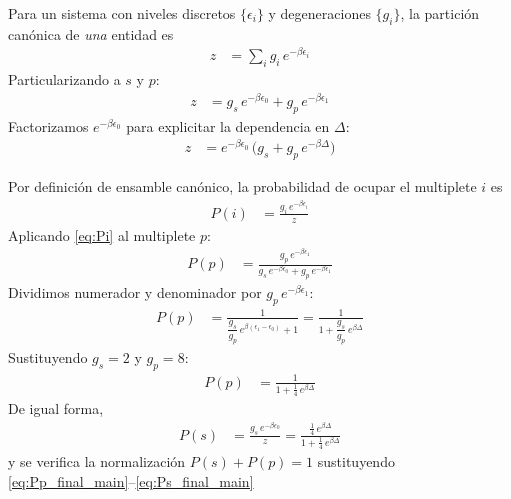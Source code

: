 \documentclass{article}
\begin{document}
Para un sistema con niveles discretos $\{\epsilon_i\}$ y degeneraciones $\{g_i\}$, la partición canónica de \textit{una} entidad es
\begin{equation}
\begin{split}
z &= \sum_i g_i\,e^{-\beta \epsilon_i}
\end{split}\label{eq:z_general}
\end{equation}
Particularizando a $s$ y $p$:
\begin{equation}
\begin{split}
z &= g_s\,e^{-\beta \epsilon_0}+g_p\,e^{-\beta \epsilon_1}
\end{split}\label{eq:z_sp}
\end{equation}
Factorizamos $e^{-\beta\epsilon_0}$ para explicitar la dependencia en $\Delta$:
\begin{equation}
\begin{split}
z &= e^{-\beta\epsilon_0}\,\Big(g_s+g_p\,e^{-\beta\Delta}\Big)
\end{split}\label{eq:z_sp_factor}
\end{equation}



Por definición de ensamble canónico, la probabilidad de ocupar el multiplete $i$ es
\begin{equation}
\begin{split}
P(i) &= \frac{g_i\,e^{-\beta \epsilon_i}}{z}
\end{split}\label{eq:Pi}
\end{equation}
Aplicando \eqref{eq:Pi} al multiplete $p$:
\begin{equation}
\begin{split}
P(p) &= \frac{g_p\,e^{-\beta \epsilon_1}}{g_s\,e^{-\beta \epsilon_0}+g_p\,e^{-\beta \epsilon_1}}
\end{split}\label{eq:Pp_raw}
\end{equation}
Dividimos numerador y denominador por $g_p\,e^{-\beta\epsilon_1}$:
\begin{equation}
\begin{split}
P(p) &= \frac{1}{\dfrac{g_s}{g_p}\,e^{\beta(\epsilon_1-\epsilon_0)}+1}
= \frac{1}{1+\dfrac{g_s}{g_p}\,e^{\beta\Delta}}
\end{split}\label{eq:Pp_clean}
\end{equation}
Sustituyendo $g_s=2$ y $g_p=8$:
\begin{equation}
\begin{split}
P(p) &= \frac{1}{1+\tfrac{1}{4}\,e^{\beta\Delta}}
\end{split}\label{eq:Pp_final_main}
\end{equation}
De igual forma,
\begin{equation}
\begin{split}
P(s) &= \frac{g_s\,e^{-\beta \epsilon_0}}{z}
= \frac{\tfrac{1}{4}\,e^{\beta\Delta}}{1+\tfrac{1}{4}\,e^{\beta\Delta}}
\end{split}\label{eq:Ps_final_main}
\end{equation}
y se verifica la normalización $P(s)+P(p)=1$ sustituyendo \eqref{eq:Pp_final_main}–\eqref{eq:Ps_final_main}
\end{document}
